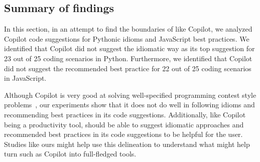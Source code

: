 \subsection{Summary of findings}
In this section, in an attempt to find the boundaries of \cct{} like Copilot, we analyzed Copilot code suggestions for Pythonic idioms and JavaScript best practices. 
We identified that Copilot did not suggest the idiomatic way as its top suggestion for 23 out of 25 coding scenarios in Python. 
Furthermore, we identified that Copilot did not suggest the recommended best practice for 22 out of 25 coding scenarios in JavaScript.

Although Copilot is very good at solving well-specified programming contest style problems~\cite{empirical_eval}, our experiments show that it does not do well in following idioms and recommending best practices in its code suggestions.
Additionally, \cct{} like Copilot being a productivity tool, should be able to suggest idiomatic approaches and recommended best practices in its code suggestions to be helpful for the user.
Studies like ours might help use this delineation to understand what might help turn \cct{} such as Copilot into full-fledged \AISE{} tools.